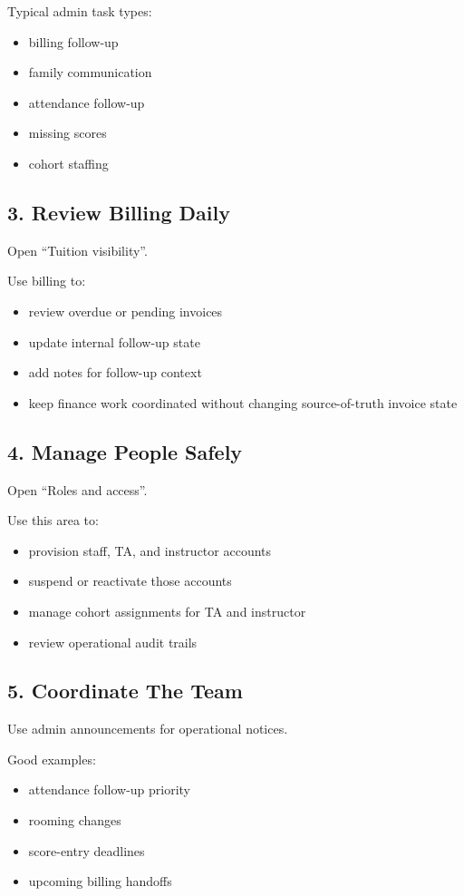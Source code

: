 \documentclass[11pt]{article}
\begin{document}
Typical admin task types:
\begin{itemize}
  \item billing follow-up
  \item family communication
  \item attendance follow-up
  \item missing scores
  \item cohort staffing
\end{itemize}

\subsection*{3. Review Billing Daily}
Open ``Tuition visibility''.

Use billing to:
\begin{itemize}
  \item review overdue or pending invoices
  \item update internal follow-up state
  \item add notes for follow-up context
  \item keep finance work coordinated without changing source-of-truth invoice state
\end{itemize}

\subsection*{4. Manage People Safely}
Open ``Roles and access''.

Use this area to:
\begin{itemize}
  \item provision staff, TA, and instructor accounts
  \item suspend or reactivate those accounts
  \item manage cohort assignments for TA and instructor
  \item review operational audit trails
\end{itemize}

\subsection*{5. Coordinate The Team}
Use admin announcements for operational notices.

Good examples:
\begin{itemize}
  \item attendance follow-up priority
  \item rooming changes
  \item score-entry deadlines
  \item upcoming billing handoffs
\end{itemize}
\end{document}
